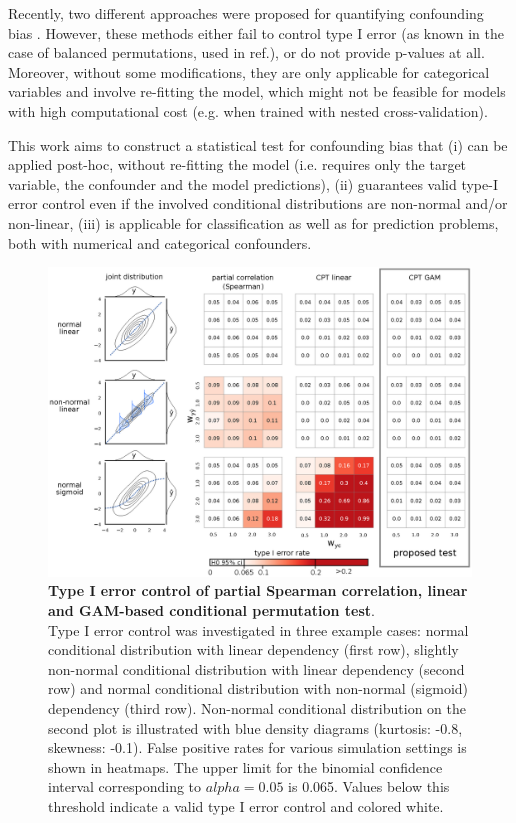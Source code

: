 \documentclass{article}
\begin{document}
Recently, two different approaches were proposed for quantifying confounding bias \citep{chaibub2019permutation, ferrari2020measuring}. However, these methods either fail to control type I error (as known in the case of balanced permutations\cite{southworth2009properties, hemerik2018exact}, used in ref.\cite{chaibub2019permutation}), or do not provide p-values at all\cite{ferrari2020measuring}. 
Moreover, without some modifications, they are only applicable for categorical variables and involve re-fitting the model, which might not be feasible for models with high computational cost (e.g. when trained with nested cross-validation).

This work aims to construct a statistical test for confounding bias that (i) can be applied post-hoc, without re-fitting the model (i.e. requires only the target variable, the confounder and the model predictions), (ii) guarantees valid type-I error control even if the involved conditional distributions are non-normal and/or non-linear, (iii) is applicable for classification as well as for prediction problems, both with numerical and categorical confounders.

\begin{figure}[!b]
  \centering
  \includegraphics[width=0.5\paperwidth]{fig/sim_h0_demo.eps}
  \caption{\textbf{Type I error control of partial Spearman correlation, linear and GAM-based conditional permutation test}. \\
  Type I error control was investigated in three example cases: normal conditional distribution with linear dependency (first row), slightly non-normal conditional distribution with linear dependency (second row) and normal conditional distribution with non-normal (sigmoid) dependency (third row). Non-normal conditional distribution on the second plot is illustrated with blue density diagrams (kurtosis: -0.8, skewness: -0.1). False positive rates for various simulation settings is shown in heatmaps. The upper limit for the binomial confidence interval corresponding to $alpha=0.05$ is 0.065. Values below this threshold indicate a valid type I error control and colored white.
  }
  \label{fig:sim-h0-demo}
\end{figure}
\end{document}
